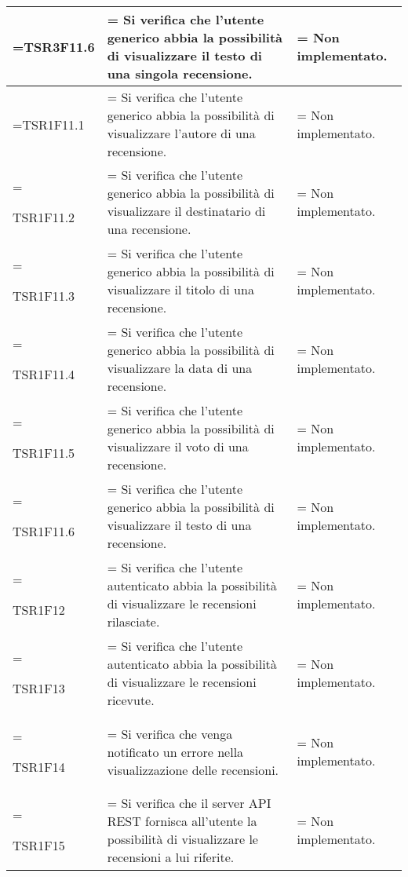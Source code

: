 \begin{xltabular}{\textwidth} {
            >{\hsize\linewidth=\hsize}X
            >{\hsize\linewidth=\hsize}X
            >{\hsize\linewidth=\hsize}X
        }
        TSR3F11.6 &
        Si verifica che l'utente generico abbia la possibilità di visualizzare il testo di una singola recensione.  &
        Non implementato.
        \\ \hline
        
        TSR1F11.1 &
        Si verifica che l'utente generico abbia la possibilità di visualizzare l'autore di una recensione.  &
        Non implementato.
        \\ \hline
        
        TSR1F11.2 &
        Si verifica che l'utente generico abbia la possibilità di visualizzare il destinatario di una recensione.  &
        Non implementato.
        \\ \hline

        TSR1F11.3 &
        Si verifica che l'utente generico abbia la possibilità di visualizzare il titolo di una recensione.  &
        Non implementato.
        \\ \hline

        TSR1F11.4 &
        Si verifica che l'utente generico abbia la possibilità di visualizzare la data di una recensione.  &
        Non implementato.
        \\ \hline

        TSR1F11.5 &
        Si verifica che l'utente generico abbia la possibilità di visualizzare il voto di una recensione.  &
        Non implementato.
        \\ \hline

        TSR1F11.6 &
        Si verifica che l'utente generico abbia la possibilità di visualizzare il testo di una recensione.  &
        Non implementato.
        \\ \hline

        TSR1F12 &
        Si verifica che l'utente autenticato abbia la possibilità di visualizzare le recensioni rilasciate.  &
        Non implementato.
        \\ \hline

        TSR1F13 &
        Si verifica che l'utente autenticato abbia la possibilità di visualizzare le recensioni ricevute.  &
        Non implementato.
        \\ \hline

        TSR1F14 &
        Si verifica che venga notificato un errore nella visualizzazione delle recensioni.  &
        Non implementato.
        \\ \hline

        TSR1F15 &
        Si verifica che il server API REST fornisca all'utente la possibilità di visualizzare le recensioni a lui riferite. &
        Non implementato.
        \\ \hline


\end{xltabular}
